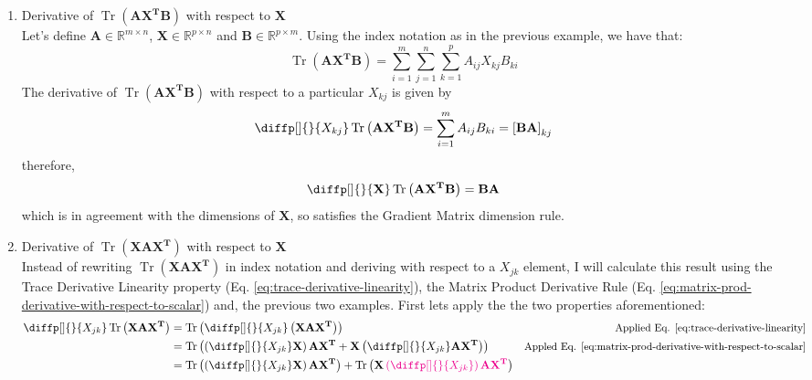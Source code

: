 \documentclass[12pt]{article}
\newcommand{\mat}[1]{\boldsymbol{\mathbf{#1}}}
\newcommand{\brac}[1]{\left[#1\right]} %
\newcommand{\parentheses}[1]{\left(#1\right)}
\newcommand{\Sum}[3][i]{\sum\limits_{#1 = #2}^{#3}}
\newcommand{\R}{\mathbb{R}}
\DeclareMathOperator{\Tr}{Tr}
\newcommand{\magenta}[1]{\color{magenta}#1\color{black}}
\begin{document}
\begin{enumerate}
    \item Derivative of $\Tr\parentheses{\mat{A X^T B}}$ with respect to $\mat{X}$\\
    Let's define $\mat{A} \in \R^{m\times n}$, $\mat{X} \in \R^{p\times n}$ and $\mat{B} \in \R^{p\times m}$. Using the index notation as in the previous example, we have that:
    \begin{equation*}
        \Tr\parentheses{\mat{A X^T B}} = \Sum{1}{m}\Sum[j]{1}{n}\Sum[k]{1}{p} A_{ij} X_{kj} B_{ki}
    \end{equation*}
    The derivative of $\Tr\parentheses{\mat{AX^TB}}$ with respect to a particular $X_{kj}$ is given by
    \begin{equation}
        \diffp[]{}{X_{kj}} \Tr\parentheses{\mat{AX^TB}} = \Sum{1}{m} A_{ij} B_{ki} = \brac{\mat{B A}}_{kj}
        \label{eq:trace-ax^tb-derivative-with-respect-to-scalar}
    \end{equation}
    therefore,
    \begin{equation}
        \diffp[]{}{\mat{X}} \Tr\parentheses{\mat{AX^TB}} = \mat{B A}
        \label{eq:trace-ax^tb-derivative}
    \end{equation}
    which is in agreement with the dimensions of $\mat{X}$, so satisfies the Gradient Matrix dimension rule.
    \item Derivative of $\Tr\parentheses{\mat{X A X^T}}$ with respect to $\mat{X}$\\
    Instead of rewriting $\Tr\parentheses{\mat{X A X^T}}$ in index notation and deriving with respect to a $X_{jk}$ element, I will calculate this result using the Trace Derivative Linearity property (Eq. \ref{eq:trace-derivative-linearity}), the Matrix Product Derivative Rule (Eq. \ref{eq:matrix-prod-derivative-with-respect-to-scalar}) and, the previous two examples.
    First lets apply the the two properties aforementioned:
    \begin{equation*}
        \begin{aligned}
            \diffp[]{}{X_{jk}} \Tr\parentheses{\mat{X A X^T}} &= \Tr\parentheses{\diffp[]{}{X_{jk}} \parentheses{\mat{X A X^T}}} & \text{\small Applied Eq. \ref{eq:trace-derivative-linearity}}\\
            &= \Tr\parentheses{\parentheses{\diffp[]{}{X_{jk}} \mat{X}} \mat{A X^T} + \mat{X}\parentheses{\diffp[]{}{X_{jk}} \mat{A X^T}}} & \text{\small Appled Eq. \ref{eq:matrix-prod-derivative-with-respect-to-scalar}}\\
            &= \Tr\parentheses{\parentheses{\diffp[]{}{X_{jk}} \mat{X}} \mat{A X^T}} + \Tr\parentheses{\mat{X}\magenta{\parentheses{\diffp[]{}{X_{jk}}} \mat{A X^T}}}\\

\end{aligned}
\end{equation*}
\end{enumerate}
\end{document}
